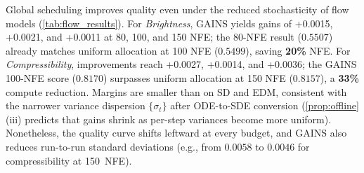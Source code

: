 Global scheduling improves quality even under the reduced stochasticity
of flow models (\cref{tab:flow_results}).
For \textit{Brightness}, GAINS yields gains of
+0.0015, +0.0021, and +0.0011 at 80, 100, and 150 NFE;
the 80-NFE result ($0.5507$) already matches
uniform allocation at 100 NFE ($0.5499$), saving \textbf{20\%} NFE.
For \textit{Compressibility}, improvements reach +0.0027, +0.0014,
and +0.0036;
the GAINS 100-NFE score ($0.8170$) surpasses uniform allocation at 150 NFE
($0.8157$), a \textbf{33\%} compute reduction.
Margins are smaller than on SD and EDM, consistent with the narrower
variance dispersion $\{\sigma_t\}$ after ODE-to-SDE conversion
(\cref{prop:offline}(iii) predicts that gains shrink as per-step variances become
more uniform).
Nonetheless, the quality curve shifts leftward at every budget,
and GAINS also reduces run-to-run standard deviations (e.g., from $0.0058$ to $0.0046$ for compressibility at 150~NFE).
